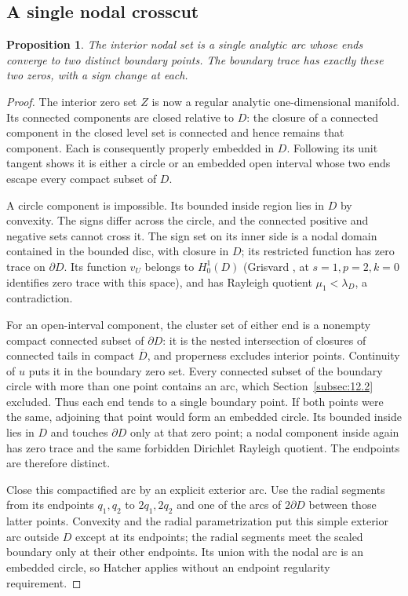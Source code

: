 \documentclass[11pt]{article}
\newtheorem{proposition}[theorem]{Proposition}
\theoremstyle{definition}
\theoremstyle{remark}
\numberwithin{equation}{section}
\begin{document}
\subsection{A single nodal crosscut}\label{subsec:12.3}
\begin{proposition}\label{prop:crosscut}
The interior nodal set is a single analytic arc whose ends converge to two distinct boundary points. The boundary trace has exactly these two zeros, with a sign change at each.
\end{proposition}
\begin{proof}

The interior zero set $Z$ is now a regular analytic one-dimensional manifold. Its connected components are closed relative to $D$: the closure of a connected component in the closed level set is connected and hence remains that component. Each is consequently properly embedded in $D$. Following its unit tangent shows it is either a circle or an embedded open interval whose two ends escape every compact subset of $D$.

A circle component is impossible. Its bounded inside region lies in $D$ by convexity. The signs differ across the circle, and the connected positive and negative sets cannot cross it. The sign set on its inner side is a nodal domain contained in the bounded disc, with closure in $D$; its restricted function has zero trace on $\partial D$. Its function $v_U$ belongs to $H^1_0(D)$ (Grisvard \cite[Theorem~1.5.1.5, p.~38]{Grisvard}, at $s=1,p=2,k=0$ identifies zero trace with this space), and has Rayleigh quotient $\mu_1<\lambda_D$, a contradiction.

For an open-interval component, the cluster set of either end is a nonempty compact connected subset of $\partial D$: it is the nested intersection of closures of connected tails in compact $\overline D$, and properness excludes interior points. Continuity of $u$ puts it in the boundary zero set. Every connected subset of the boundary circle with more than one point contains an arc, which Section~\ref{subsec:12.2} excluded. Thus each end tends to a single boundary point. If both points were the same, adjoining that point would form an embedded circle. Its bounded inside lies in $D$ and touches $\partial D$ only at that zero point; a nodal component inside again has zero trace and the same forbidden Dirichlet Rayleigh quotient. The endpoints are therefore distinct.

Close this compactified arc by an explicit exterior arc. Use the radial segments from its endpoints $q_1,q_2$ to $2q_1,2q_2$ and one of the arcs of $2\partial D$ between those latter points. Convexity and the radial parametrization put this simple exterior arc outside $D$ except at its endpoints; the radial segments meet the scaled boundary only at their other endpoints. Its union with the nodal arc is an embedded circle, so Hatcher \cite[Proposition~2B.1(b)]{HatcherAT} applies without an endpoint regularity requirement.


\end{proof}
\end{document}
